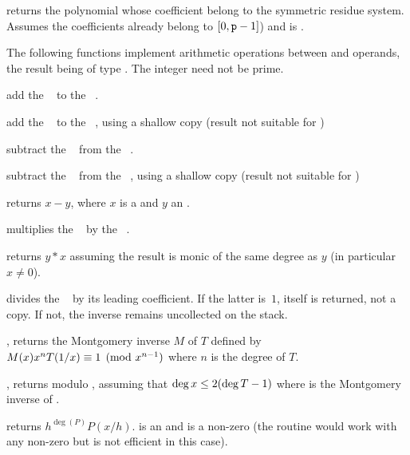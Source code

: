  returns the polynomial whose
coefficient belong to the symmetric residue system. Assumes the coefficients
already belong to $[0,{\tt p}-1]$) and  is .


The following functions implement arithmetic operations between 
and  operands, the result being of type . The integer
 need not be prime.

 add the ~ to the
~.

 add the ~
to the ~, using a shallow copy (result not suitable for
)

 subtract the ~ from
the ~.

 subtract the
~ from the ~, using a shallow copy (result not
suitable for )

 returns $x - y$, where $x$ is
a  and $y$ an .

 multiplies the ~
by the ~.

 returns $y*x$ assuming the
result is monic of the same degree as $y$ (in particular $x\neq 0$).


 divides the ~ by its
leading coefficient. If the latter is~$1$,  itself is returned, not a
copy. If not, the inverse remains uncollected on the stack.

, returns the Montgomery inverse
$M$ of $T$ defined by $M(x)\*x^n\*T(1/x)\equiv 1\pmod{x^{n-1}}$ where $n$ is
the degree of $T$.

, returns
 modulo , assuming that $\deg x\leq 2\*(\deg{T} - 1)$ where
 is the Montgomery inverse of .

 returns $h^{\deg(P)} P(x/h)$.
 is an  and  is a non-zero  (the routine would
work with any non-zero  but is not efficient in this case).

